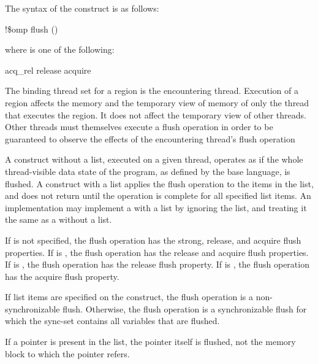 \begin{fortranspecific}
The syntax of the  construct is as follows:

\begin{boxedcode}
!\$omp flush  \plc{[}()\plc{]}
\end{boxedcode}
\begin{samepage}
where  is one of the following:

\begin{indentedcodelist}
acq\_rel
release
acquire
\end{indentedcodelist}
\end{samepage}
\end{fortranspecific}

\binding
The binding thread set for a  region is the encountering thread. Execution of a 
 region affects the memory and the temporary view of memory of only the thread 
that executes the region. It does not affect the temporary view of other threads. Other 
threads must themselves execute a flush operation in order to be guaranteed to observe 
the effects of the encountering thread’s flush operation

\descr
A  construct without a list, executed on a given thread, operates as if the whole 
thread-visible data state of the program, as defined by the base language, is flushed. A 
 construct with a list applies the flush operation to the items in the list, and does 
not return until the operation is complete for all specified list items. An implementation 
may implement a  with a list by ignoring the list, and treating it the same as a 
 without a list.

If  is not specified, the flush operation has the
strong, release, and acquire flush properties. 
If  is , the flush operation has the
release and acquire flush properties. 
If  is , the flush operation has the
release flush property.
If  is , the flush operation has the
acquire flush property.

If list items are specified on the  construct, the flush operation
is a non-synchronizable flush.  Otherwise, the flush operation is a
synchronizable flush for which the sync-set contains all variables that are
flushed.

\begin{ccppspecific}
If a pointer is present in the list, the pointer itself is flushed, not the memory block to 
which the pointer refers.
\end{ccppspecific}

